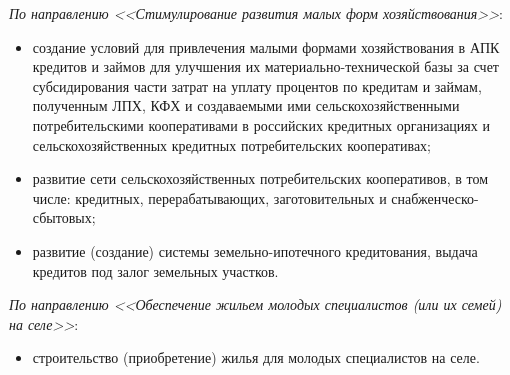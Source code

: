 \documentclass[article, 12pt, russian, oneside]{ncc}
\begin{document}
\emph{По направлению <<Стимулирование развития малых форм
  хозяйствования>>}:

\begin{itemize}
\item создание условий для привлечения малыми формами хозяйствования в
  АПК кредитов и займов для улучшения их материально-технической базы
  за счет субсидирования части затрат на уплату процентов по кредитам
  и займам, полученным ЛПХ, КФХ и создаваемыми ими
  сельскохозяйственными потребительскими кооперативами в российских
  кредитных организациях и сельскохозяйственных кредитных
  потребительских кооперативах;
\item развитие сети сельскохозяйственных потребительских кооперативов,
  в том числе: кредитных, перерабатывающих, заготовительных и
  снабженческо-сбытовых;
\item развитие (создание) системы земельно-ипотечного кредитования,
  выдача кредитов под залог земельных участков.
\end{itemize}

\emph{По направлению <<Обеспечение жильем молодых специалистов (или их
  семей) на селе>>}:

\begin{itemize}
\item строительство (приобретение) жилья для молодых специалистов на
  селе.
\end{itemize}
\end{document}
